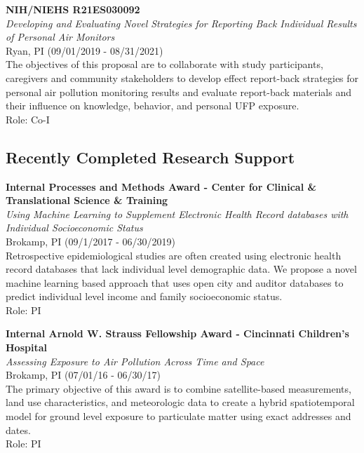 \documentclass{nihbiosketch}
\begin{document}
\bigskip

\textbf{NIH/NIEHS R21ES030092}\\
\emph{Developing and Evaluating Novel Strategies for Reporting Back Individual
  Results of Personal Air Monitors}\\
Ryan, PI (09/01/2019 - 08/31/2021)\\
The objectives of this proposal are to collaborate with study participants, caregivers and community stakeholders to develop effect report-back strategies for personal air pollution monitoring results and evaluate report-back materials and their influence on knowledge, behavior, and personal UFP exposure.\\
Role: Co-I

\bigskip

\subsection*{Recently Completed Research Support}

\bigskip

\textbf{Internal Processes and Methods Award - Center for Clinical \&
  Translational Science \& Training}\\
\emph{Using Machine Learning to Supplement Electronic Health Record
  databases with Individual Socioeconomic Status}\\
Brokamp, PI (09/1/2017 - 06/30/2019)\\
Retrospective epidemiological studies are often created using electronic
health record databases that lack individual level demographic data. We
propose a novel machine learning based approach that uses open city and
auditor databases to predict individual level income and family
socioeconomic status.\\
Role: PI

\bigskip

\textbf{Internal Arnold W. Strauss Fellowship Award - Cincinnati
Children's Hospital}\\
\emph{Assessing Exposure to Air Pollution Across Time and Space}\\
Brokamp, PI (07/01/16 - 06/30/17)\\
The primary objective of this award is to combine satellite-based
measurements, land use characteristics, and meteorologic data to create
a hybrid spatiotemporal model for ground level exposure to particulate
matter using exact addresses and dates.\\
Role: PI

\bigskip
\end{document}
